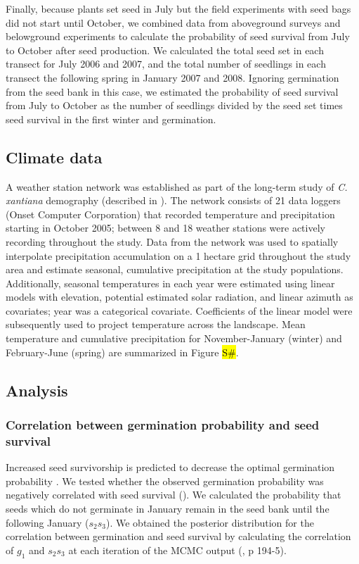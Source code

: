\documentclass[12pt, oneside, titlepage]{article}   	%
\begin{document}
Finally, because plants set seed in July but the field experiments with seed bags did not start until October, we combined data from aboveground surveys and belowground experiments to calculate the probability of seed survival from July to October after seed production. We calculated the total seed set in each transect for July 2006 and 2007, and the total number of seedlings in each transect the following spring in January 2007 and 2008. Ignoring germination from the seed bank in this case, we estimated the probability of seed survival from July to October as the number of seedlings divided by the seed set times seed survival in the first winter and germination.

\subsection{Climate data}

A weather station network was established as part of the long-term study of \textit{C. xantiana} demography (described in \cite{eckhart2011}). The network consists of 21 data loggers (Onset Computer Corporation) that recorded temperature and precipitation starting in October 2005; between 8 and 18 weather stations were actively recording throughout the study. Data from the network was used to spatially interpolate precipitation accumulation on a 1 hectare grid throughout the study area and estimate seasonal, cumulative precipitation at the study populations. Additionally, seasonal temperatures in each year were estimated using linear models with elevation, potential estimated solar radiation, and linear azimuth as covariates; year was a categorical covariate. Coefficients of the linear model were subsequently used to project temperature across the landscape. Mean temperature and cumulative precipitation for November-January (winter) and February-June (spring) are summarized in Figure \hl{S\#}.

\subsection{Analysis}

\subsubsection{Correlation between germination probability and seed survival}

Increased seed survivorship is predicted to decrease the optimal germination probability \cite{cohen1966,ellner1985a}. We tested whether the observed germination probability was negatively correlated with seed survival (\cite{gremer2014}). We calculated the probability that seeds which do not germinate in January remain in the seed bank until the following January ($s_2 s_3$). We obtained the posterior distribution for the correlation between germination and seed survival by calculating the correlation of $g_1$ and $s_2 s_3$ at each iteration of the MCMC output (\cite{hobbs2015b}, p 194-5). 
\end{document}
